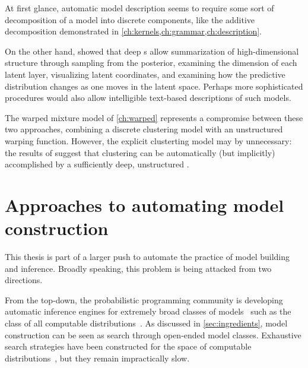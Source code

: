 \begin{itemize}
At first glance, automatic model description seems to require some sort of decomposition of a model into discrete components, like the additive decomposition demonstrated in \cref{ch:kernels,ch:grammar,ch:description}.

On the other hand, \citet{damianou2012deep} showed that deep \gp{}s allow summarization of high-dimensional structure through sampling from the posterior, examining the dimension of each latent layer, visualizing latent coordinates, and examining how the predictive distribution changes as one moves in the latent space.
Perhaps more sophisticated procedures would also allow intelligible text-based descriptions of such models.

\end{itemize}

The warped mixture model of \cref{ch:warped} represents a compromise between these two approaches, combining a discrete clustering model with an unstructured warping function.
However, the explicit clusterting model may by unnecessary: the results of \citet{damianou2012deep} suggest that clustering can be automatically (but implicitly) accomplished by a sufficiently deep, unstructured \gp{}.




\section{Approaches to automating model construction}

This thesis is part of a larger push to automate the practice of model building and inference.
Broadly speaking, this problem is being attacked from two directions.

From the top-down, the probabilistic programming community is developing automatic inference engines for extremely broad classes of models~\citep{goodman2008church,mansinghka2014venture,liang2010learning,Wood-AISTATS-2014} such as the class of all computable distributions~\citep{solomonoff1964formal, li2009introduction}.
As discussed in \cref{sec:ingredients}, model construction can be seen as search through open-ended model classes.
Exhaustive search strategies have been constructed for the space of computable distributions~\citep{hutter2002fastest,schmidhuber2002speed,levin1973universal}, but they remain impractically slow.

